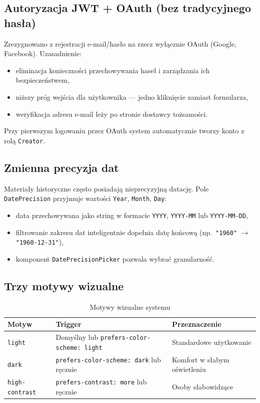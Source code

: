 \documentclass[12pt, a4paper]{article}
\begin{document}
\subsection{Autoryzacja JWT + OAuth (bez tradycyjnego hasła)}

Zrezygnowano z rejestracji e-mail/hasło na rzecz wyłącznie OAuth (Google, Facebook).
Uzasadnienie:

\begin{itemize}
  \item eliminacja konieczności przechowywania haseł i zarządzania ich bezpieczeństwem,
  \item niższy próg wejścia dla użytkownika --- jedno kliknięcie zamiast formularza,
  \item weryfikacja adresu e-mail leży po stronie dostawcy tożsamości.
\end{itemize}

Przy pierwszym logowaniu przez OAuth system automatycznie tworzy konto z rolą \texttt{Creator}.

\subsection{Zmienna precyzja dat}

Materiały historyczne często posiadają nieprecyzyjną datację. Pole \texttt{DatePrecision}
przyjmuje wartości \texttt{Year}, \texttt{Month}, \texttt{Day}:

\begin{itemize}
  \item data przechowywana jako string w formacie \texttt{YYYY}, \texttt{YYYY-MM}
        lub \texttt{YYYY-MM-DD},
  \item filtrowanie zakresu dat inteligentnie dopełnia datę końcową
        (np.\ \texttt{"1960"} $\to$ \texttt{"1960-12-31"}),
  \item komponent \texttt{DatePrecisionPicker} pozwala wybrać granularność.
\end{itemize}

\subsection{Trzy motywy wizualne}

\begin{table}[H]
  \centering
  \caption{Motywy wizualne systemu}
  \begin{tabular}{@{}L{3.5cm}L{4.5cm}L{5cm}@{}}
    \toprule
    \textbf{Motyw} & \textbf{Trigger} & \textbf{Przeznaczenie} \\
    \midrule
    \texttt{light} & Domyślny lub \texttt{prefers-color-scheme: light} & Standardowe użytkowanie \\
    \texttt{dark} & \texttt{prefers-color-scheme: dark} lub ręcznie & Komfort w słabym oświetleniu \\
    \texttt{high-contrast} & \texttt{prefers-contrast: more} lub ręcznie & Osoby słabowidzące \\
    \bottomrule
  \end{tabular}
\end{table}
\end{document}
